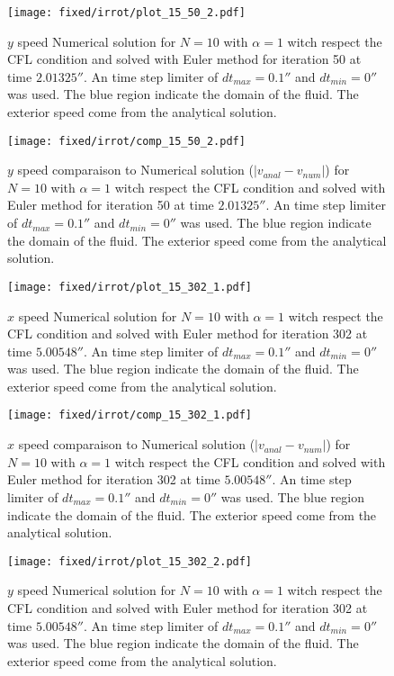 \begin{figure}
\texttt{[image: fixed/irrot/plot\_15\_50\_2.pdf]}
\caption{$y$ speed Numerical solution for $N=10$ with $\alpha=1$ witch respect the CFL condition and solved with Euler method
for iteration 50 at time $\unit{2.01325}{\second}$.
An time step limiter of $dt_{max}=\unit{0.1}{\second}$ and $dt_{min}=\unit{0}{\second}$ was used.
The blue region indicate the domain of the fluid. The exterior speed come from the analytical solution.
\label{fix:plot_15_50_2}
}
\end{figure}

\begin{figure}
\texttt{[image: fixed/irrot/comp\_15\_50\_2.pdf]}
\caption{$y$ speed comparaison to Numerical solution ($|v_{anal}-v_{num}|$) for $N=10$ with $\alpha=1$ witch respect the CFL condition and solved with Euler method
for iteration 50 at time $\unit{2.01325}{\second}$.
An time step limiter of $dt_{max}=\unit{0.1}{\second}$ and $dt_{min}=\unit{0}{\second}$ was used.
The blue region indicate the domain of the fluid. The exterior speed come from the analytical solution.
\label{fix:comp_15_50_2}
}
\end{figure}

\clearpage

\begin{figure}
\texttt{[image: fixed/irrot/plot\_15\_302\_1.pdf]}
\caption{$x$ speed Numerical solution for $N=10$ with $\alpha=1$ witch respect the CFL condition and solved with Euler method
for iteration 302 at time $\unit{5.00548}{\second}$.
An time step limiter of $dt_{max}=\unit{0.1}{\second}$ and $dt_{min}=\unit{0}{\second}$ was used.
The blue region indicate the domain of the fluid. The exterior speed come from the analytical solution.
\label{fix:plot_15_302_1}
}
\end{figure}

\begin{figure}
\texttt{[image: fixed/irrot/comp\_15\_302\_1.pdf]}
\caption{$x$ speed comparaison to Numerical solution ($|v_{anal}-v_{num}|$) for $N=10$ with $\alpha=1$ witch respect the CFL condition and solved with Euler method
for iteration 302 at time $\unit{5.00548}{\second}$.
An time step limiter of $dt_{max}=\unit{0.1}{\second}$ and $dt_{min}=\unit{0}{\second}$ was used.
The blue region indicate the domain of the fluid. The exterior speed come from the analytical solution.
\label{fix:comp_15_302_1}
}
\end{figure}

\begin{figure}
\texttt{[image: fixed/irrot/plot\_15\_302\_2.pdf]}
\caption{$y$ speed Numerical solution for $N=10$ with $\alpha=1$ witch respect the CFL condition and solved with Euler method
for iteration 302 at time $\unit{5.00548}{\second}$.
An time step limiter of $dt_{max}=\unit{0.1}{\second}$ and $dt_{min}=\unit{0}{\second}$ was used.
The blue region indicate the domain of the fluid. The exterior speed come from the analytical solution.
\label{fix:plot_15_302_2}
}
\end{figure}

